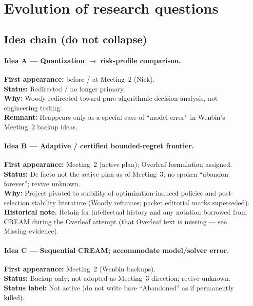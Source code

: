 \documentclass[11pt]{article}
\begin{document}
\section{Evolution of research questions}

\subsection{Idea chain (do not collapse)}

\paragraph{Idea A --- Quantization $\to$ risk-profile comparison.}
\textbf{First appearance:} before / at Meeting~2 (Nick).\\
\textbf{Status:} \textcolor{superseded}{Redirected / no longer primary}.\\
\textbf{Why:} Woody redirected toward pure algorithmic decision analysis, not engineering
testing.\\
\textbf{Remnant:} Reappears only as a special case of ``model error'' in Wenbin's Meeting~2
backup ideas.

\paragraph{Idea B --- Adaptive / certified bounded-regret frontier.}
\textbf{First appearance:} Meeting~2 (active plan); Overleaf formulation assigned.\\
\textbf{Status:} \textcolor{superseded}{De facto not the active plan as of Meeting~3};
no spoken ``abandon forever''; revive unknown.\\
\textbf{Why:} Project pivoted to stability of optimization-induced policies and post-selection
stability literature (Woody reframes; packet editorial marks superseded).\\
\textbf{Historical note.} Retain for intellectual history and any notation borrowed from CREAM
during the Overleaf attempt (that Overleaf text is missing --- see Missing evidence).

\paragraph{Idea C --- Sequential CREAM; accommodate model/solver error.}
\textbf{First appearance:} Meeting~2 (Wenbin backups).\\
\textbf{Status:} Backup only; not adopted as Meeting~3 direction; revive unknown.\\
\textbf{Status label:} Not active (do not write bare ``Abandoned'' as if permanently killed).
\end{document}
